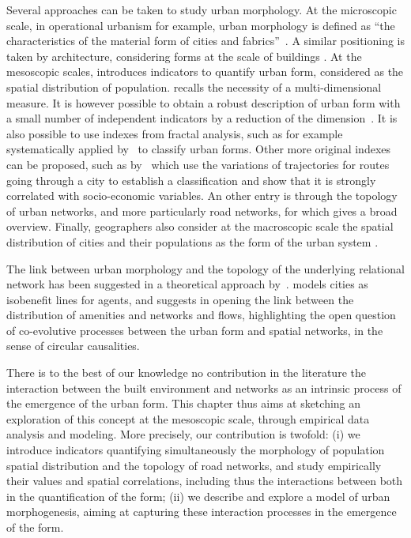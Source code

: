 Several approaches can be taken to study urban morphology. At the microscopic scale, in operational urbanism for example, urban morphology is defined as ``the characteristics of the material form of cities and fabrics''~\citep{paquot2010abc}. A similar positioning is taken by architecture, considering forms at the scale of buildings \citep{moudon1997urban}. At the mesoscopic scales, \cite{tsai2005quantifying} introduces indicators to quantify urban form, considered as the spatial distribution of population. \cite{le2009quantifier} recalls the necessity of a multi-dimensional measure. It is however possible to obtain a robust description of urban form with a small number of independent indicators by a reduction of the dimension~\citep{Schwarz201029}. It is also possible to use indexes from fractal analysis, such as for example systematically applied by~\cite{2016arXiv160808839C} to classify urban forms. Other more original indexes can be proposed, such as by~\cite{lee2017morphology} which use the variations of trajectories for routes going through a city to establish a classification and show that it is strongly correlated with socio-economic variables. An other entry is through the topology of urban networks, and more particularly road networks, for which \citep{2015arXiv151201268L} gives a broad overview. Finally, geographers also consider at the macroscopic scale the spatial distribution of cities and their populations as the form of the urban system \citep{pumain2011systems}.



The link between urban morphology and the topology of the underlying relational network has been suggested in a theoretical approach by~\cite{badariotti2007conception}. \cite{d2015mathematize} models cities as isobenefit lines for agents, and suggests in opening the link between the distribution of amenities and networks and flows, highlighting the open question of co-evolutive processes between the urban form and spatial networks, in the sense of circular causalities.

There is to the best of our knowledge no contribution in the literature  the interaction between the built environment and networks as an intrinsic process of the emergence of the urban form. This chapter thus aims at sketching an exploration of this concept at the mesoscopic scale, through empirical data analysis and modeling. More precisely, our contribution is twofold: (i) we introduce indicators quantifying simultaneously the morphology of population spatial distribution and the topology of road networks, and study empirically their values and spatial correlations, including thus the interactions between both in the quantification of the form; (ii) we describe and explore a model of urban morphogenesis, aiming at capturing these interaction processes in the emergence of the form.



